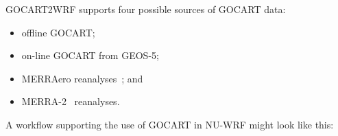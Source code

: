 GOCART2WRF supports four possible sources of GOCART data: 

\begin{itemize}

\item offline GOCART;

\item on-line GOCART from GEOS-5;

\item MERRAero reanalyses~\citep{ref:KishchaEtAl2014}; and

\item MERRA-2~\citep{ref:BosilovichEtAl2015} reanalyses.  

\end{itemize}

A workflow supporting the use of GOCART in NU-WRF might look like this:

